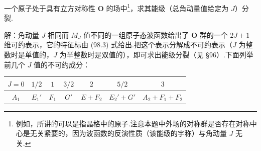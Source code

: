 \begin{xiti}

\quad 一个原子处于具有立方对称性 $\boldsymbol{O}$ 的场中\footnote{例如，所讲的可以是指晶格中的原子.注意本题中外场的对称群是否存在对称中心是无关紧要的，因为波函数的反演性质（该能级的宇称）与角动量 $J$ 无关.}，求其能级（总角动量值给定为 $J$）分裂.

解：角动量 $J$ 相同而 $M_J$ 值不同的一组原子态波函数给出了 $\boldsymbol{O}$ 群的一个 $2J+1$ 维可约表示，它的特征标由 (98.3) 式给出.把这个表示分解成不可约表示（$J$ 为整数时是单值的，$J$ 为半整数时是双值的），即可求出能级分裂（见 §96）.下面列举前几个 $J$ 值的不可约成分：

\begin{center}
\renewcommand{\arraystretch}{1.3}%
\begin{tabular}{c|c|c|c|c|c|c}
  $J=0$ & $1/2$ & $1$ & $3/2$ & $2$ & $5/2$ & $3$\\
  \hline
  $A_1$ & $E_1'$ & $F_1$ & $G'$ & $E+F_2$ & $E_2'+G'$ & $A_2+F_1+F_2$\\
\end{tabular}
\end{center}

\end{xiti}
